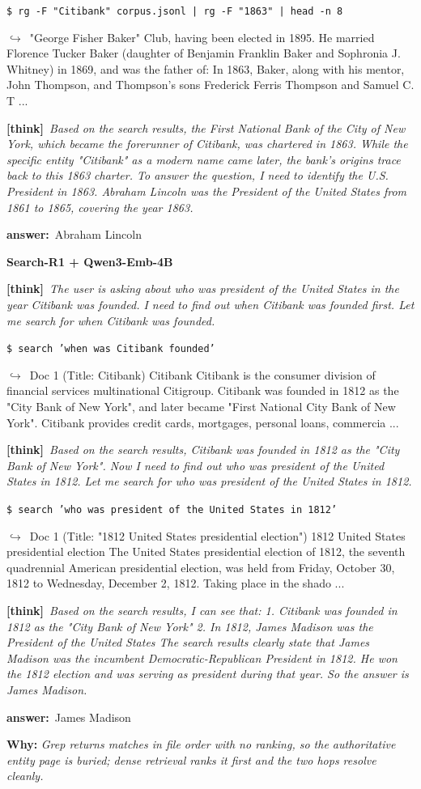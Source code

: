 \documentclass{article} %
\newcommand{\cmark}{\textcolor{green!45!black}{\ding{51}}}
\newcommand{\failbadge}{\colorbox{red!60!black}{\textcolor{white}{\scriptsize\bfseries\,FAILURE\,}}}
\newcommand{\thk}[1]{{\footnotesize\textcolor{violet!75!black}{\textbf{[think]}}\ \textit{#1}\par}}
\newcommand{\cmd}[1]{{\footnotesize\texttt{\textcolor{blue!35!black}{\$\ #1}}\par}}
\newcommand{\retr}[1]{{\footnotesize\textcolor{black!65}{\quad$\hookrightarrow$\ #1}\par}}
\newcommand{\ans}[1]{{\footnotesize\textbf{answer:}\ #1\par}}
\begin{document}
\begin{cmpbox}[label={ex:bamboogle-citibank},title={\failbadge\ \ \textsc{Bamboogle -- grep has no relevance ranking}}]
  \cmd{rg -F "Citibank" corpus.jsonl | rg -F "1863" | head -n 8}
  \retr{"George Fisher Baker" Club, having been elected in 1895. He married Florence Tucker Baker (daughter of Benjamin Franklin Baker and Sophronia J. Whitney) in 1869, and was the father of: In 1863, Baker, along with his mentor, John Thompson, and Thompson's sons Frederick Ferris Thompson and Samuel C. T ...}
  \thk{Based on the search results, the First National Bank of the City of New York, which became the forerunner of Citibank, was chartered in 1863. While the specific entity "Citibank" as a modern name came later, the bank's origins trace back to this 1863 charter. To answer the question, I need to identify the U.S. President in 1863. Abraham Lincoln was the President of the United States from 1861 to 1865, covering the year 1863.}
  \ans{Abraham Lincoln}
\smallskip\par\textbf{Search-R1 + Qwen3-Emb-4B}~\cmark\par
  \thk{The user is asking about who was president of the United States in the year Citibank was founded. I need to find out when Citibank was founded first. Let me search for when Citibank was founded.}
  \cmd{search 'when was Citibank founded'}
  \retr{Doc 1 (Title: Citibank) Citibank Citibank is the consumer division of financial services multinational Citigroup. Citibank was founded in 1812 as the "City Bank of New York", and later became "First National City Bank of New York". Citibank provides credit cards, mortgages, personal loans, commercia ...}
  \thk{Based on the search results, Citibank was founded in 1812 as the "City Bank of New York". Now I need to find out who was president of the United States in 1812. Let me search for who was president of the United States in 1812.}
  \cmd{search 'who was president of the United States in 1812'}
  \retr{Doc 1 (Title: "1812 United States presidential election") 1812 United States presidential election The United States presidential election of 1812, the seventh quadrennial American presidential election, was held from Friday, October 30, 1812 to Wednesday, December 2, 1812. Taking place in the shado ...}
  \thk{Based on the search results, I can see that: 1. Citibank was founded in 1812 as the "City Bank of New York" 2. In 1812, James Madison was the President of the United States The search results clearly state that James Madison was the incumbent Democratic-Republican President in 1812. He won the 1812 election and was serving as president during that year. So the answer is James Madison.}
  \ans{James Madison}
\smallskip\par\textbf{Why:} \textit{Grep returns matches in file order with no ranking, so the authoritative entity page is buried; dense retrieval ranks it first and the two hops resolve cleanly.}
\end{cmpbox}\bigskip
\end{document}
